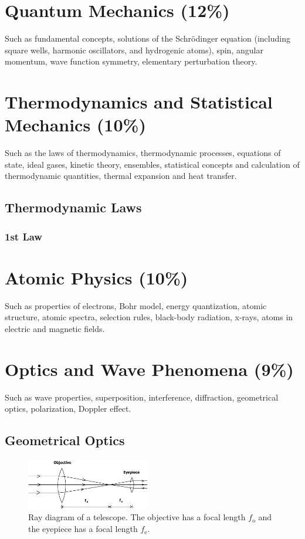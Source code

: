 \documentclass[%
 reprint,
superscriptaddress,
 amsmath,amssymb,
 aps,
prc,
]{revtex4-1}
\begin{document}
\section{Quantum Mechanics (12\%)}
Such as fundamental concepts, solutions of the Schrödinger equation (including square wells, harmonic oscillators, and hydrogenic atoms), spin, angular 
momentum, wave function symmetry, elementary perturbation theory.

\section{Thermodynamics and Statistical Mechanics (10\%)}
Such as the laws of thermodynamics, thermodynamic processes, equations of state, ideal gases, kinetic theory, ensembles, statistical concepts and calculation of thermodynamic quantities, thermal expansion and heat transfer.
\subsection{Thermodynamic Laws}
\subsubsection{1st Law}

\section{Atomic Physics (10\%)}
Such as properties of electrons, Bohr model, energy quantization, atomic structure, atomic spectra, selection rules, black-body radiation, x-rays, atoms in electric and magnetic fields.

\section{Optics and Wave Phenomena (9\%)}
Such as wave properties, superposition, interference, diffraction, geometrical optics, polarization, Doppler effect.

\subsection{Geometrical Optics}

\begin{figure}[t]
	\centering
	\includegraphics[width=0.48\textwidth]{figures/telescope}
	\caption{Ray diagram of a telescope. The objective has a focal length $f_\text{o}$ and the eyepiece has a focal length $f_\text{e}$. }
	\label{fig:telescope}
\end{figure}
\end{document}
